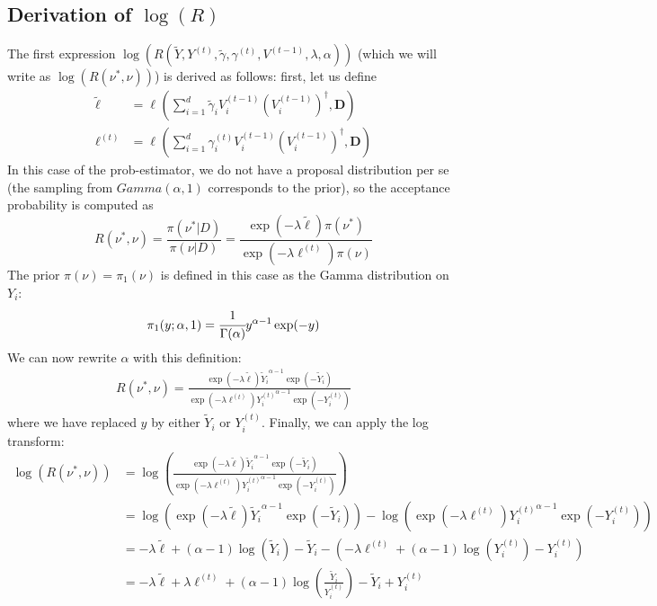 \documentclass[12pt]{memoir}
\newcommand{\mb}{\mathbf}
\begin{document}
\subsection*{Derivation of $\log(R)$}
The first expression $\log(R(\tilde Y, Y^{(t)}, \tilde \gamma, \gamma^{(t)}, V^{(t-1)}, \lambda, \alpha))$ (which we will write as $\log(R(\nu^*, \nu))$) is derived as follows: first, let us define
\begin{align}
    \tilde \ell &= \ell^{}(\sum_{i=1}^{d} \tilde \gamma_i V_i^{(t-1)} (V_i^{(t-1)})^\dagger, \mb D)\\
    \ell^{(t)} &= \ell^{}(\sum_{i=1}^{d} \gamma_i^{(t)} V_i^{(t-1)} (V_i^{(t-1)})^\dagger, \mb D)
\end{align}
In this case of the prob-estimator, we do not have a proposal distribution per se (the sampling from $Gamma(\alpha, 1)$ corresponds to the prior), so the acceptance probability is computed as
\begin{equation}
    R(\nu^*, \nu) = \frac{\pi(\nu^*|D)}{\pi(\nu|D)} = \frac{\exp(-\lambda \tilde\ell) \pi(\nu^*)}{\exp(-\lambda \ell^{(t)})\pi(\nu)}
\end{equation}
The prior $\pi(\nu) = \pi_1(\nu)$ is defined in this case as the Gamma distribution on $Y_i$:
\begin{equation}
    \pi_1(y;\alpha, 1) = \cfrac{1}{\Gamma(\alpha)}y^{\alpha - 1} \exp(-y)
\end{equation}
We can now rewrite $\alpha$ with this definition:
\begin{align}
    R(\nu^*, \nu) = \frac{\exp(-\lambda \tilde\ell) {\tilde Y_i}^{\alpha - 1} \exp(-\tilde Y_i)}{\exp(-\lambda \ell^{(t)}) {Y_i^{(t)}}^{\alpha - 1} \exp(-Y_i^{(t)})}
\end{align}
where we have replaced $y$ by either $\tilde Y_i$ or $Y^{(t)}_i$. Finally, we can apply the log transform:
\begin{align}
    \log(R(\nu^*, \nu)) &= \log\left(\frac{\exp(-\lambda \tilde\ell) {\tilde Y_i}^{\alpha - 1} \exp(-\tilde Y_i)}{\exp(-\lambda \ell^{(t)}) {Y_i^{(t)}}^{\alpha - 1} \exp(-Y_i^{(t)})}\right)\\
    &= \log(\exp(-\lambda \tilde\ell) {\tilde Y_i}^{\alpha - 1} \exp(-\tilde Y_i)) - \log(\exp(-\lambda \ell^{(t)}) {Y_i^{(t)}}^{\alpha - 1} \exp(-Y_i^{(t)}))\\
    &= -\lambda \tilde \ell + (\alpha - 1)\log(\tilde Y_i) - \tilde Y_i - (-\lambda \ell^{(t)} + (\alpha - 1)\log(Y_i^{(t)}) - Y_i^{(t)})\\
    &= -\lambda \tilde \ell + \lambda \ell^{(t)} + (\alpha -1)\log(\frac{\tilde Y_i}{Y_i^{(t)}}) - \tilde Y_i + Y_i^{(t)}
\end{align}
\end{document}
